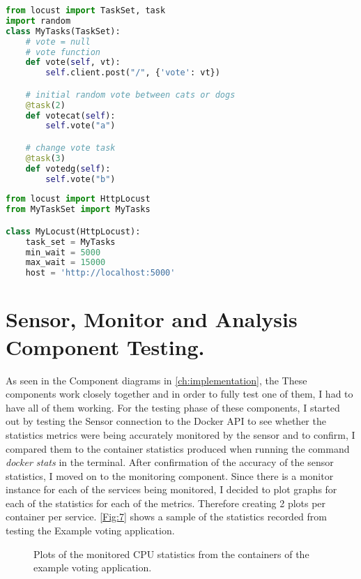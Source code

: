 \begin{lstlisting}[language=Python, caption=Example Voting App testing Script, label= lst:script1]
from locust import TaskSet, task
import random
class MyTasks(TaskSet):
    # vote = null
    # vote function
    def vote(self, vt):
        self.client.post("/", {'vote': vt})

    # initial random vote between cats or dogs
    @task(2)
    def votecat(self):
        self.vote("a")

    # change vote task
    @task(3)
    def votedg(self):
        self.vote("b")
\end{lstlisting}

\begin{lstlisting}[language=Python, caption=Locust open ports Script, label= lst:script2]
from locust import HttpLocust
from MyTaskSet import MyTasks

class MyLocust(HttpLocust):
    task_set = MyTasks
    min_wait = 5000
    max_wait = 15000
    host = 'http://localhost:5000'

\end{lstlisting}

\section{Sensor, Monitor and Analysis Component Testing.}
As seen in the Component diagrams in \autoref{ch:implementation}, the These components work closely together and in order to fully test one of them, I had to have all of them working. For the testing phase of these components, I started out by testing the Sensor connection to the Docker API to see whether the statistics metrics were being accurately monitored by the sensor and to confirm, I compared them to the container statistics produced when running the command \textit{docker stats} in the terminal. After confirmation of the accuracy of the sensor statistics, I moved on to the monitoring component. Since there is a monitor instance for each of the services being monitored, I decided to plot graphs for each of the statistics for each of the metrics. Therefore creating 2 plots per container per service. \autoref{Fig:7} shows a sample of the statistics recorded from testing the Example voting application. 
\begin{figure}[H]
\centering
  \hfill
  \hfill   
    \hfill
  \hfill
    \caption{Plots of the monitored CPU statistics from the containers of the example voting application.} 
   \label{Fig:7} 
\end{figure}

